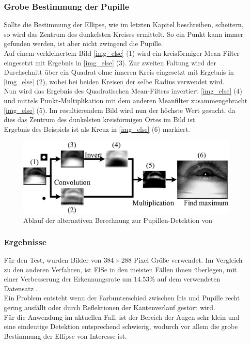 \subsubsection{Grobe Bestimmung der Pupille}
\label{ElSe_Grob}
Sollte die Bestimmung der Ellipse, wie im letzten Kapitel beschreiben, scheitern, so wird das Zentrum des dunkelsten Kreises ermittelt. So ein Punkt kann immer gefunden werden, ist aber nicht zwingend die Pupille.\\
Auf einem verkleinertem Bild \autoref{img_else} (1) wird ein kreisförmiger Mean-Filter eingesetzt mit Ergebnis in \autoref{img_else} (3). Zur zweiten Faltung wird der Durchschnitt über ein Quadrat ohne inneren Kreis eingesetzt mit Ergebnis in \autoref{img_else} (2), wobei bei beiden Kreisen der selbe Radius verwendet wird.\\
Nun wird das Ergebnis des Quadratischen Mean-Filters invertiert \autoref{img_else} (4) und mittels Punkt-Multiplikation mit dem anderen Meanfilter zusammengebracht \autoref{img_else} (5). Im resultierendem Bild wird nun der höchste Wert gesucht, da dies das Zentrum des dunkelsten kreisförmigen Ortes im Bild ist.\\
Ergebnis des Beispiels ist als Kreuz in \autoref{img_else} (6) markiert. 
\begin{figure}
	\centering
	\includegraphics[width=0.8\linewidth]{img/ElSe}
	\caption{Ablauf der alternativen Berechnung zur Pupillen-Detektion von \cite{ElSe}}
	\label{img_else}
\end{figure}
\subsubsection{Ergebnisse}
Für den Test, wurden Bilder von $384\times 288$ Pixel Größe verwendet.
Im Vergleich zu den anderen Verfahren, ist ElSe in den meisten Fällen ihnen überlegen, mit einer Verbesserung der Erkennungsrate um $14.53\%$ auf dem verwendeten Datensatz \cite{ElSe}.\\
Ein Problem entsteht wenn der Farbunterschied zwischen Iris und Pupille recht gering ausfällt oder durch Reflektionen der Kantenverlauf gestört wird.\\
Für die Anwendung im aktuellen Fall, ist der Bereich der Augen sehr klein und eine eindeutige Detektion entsprechend schwierig, wodurch vor allem die grobe Bestimmung der Ellipse von Interesse ist.

